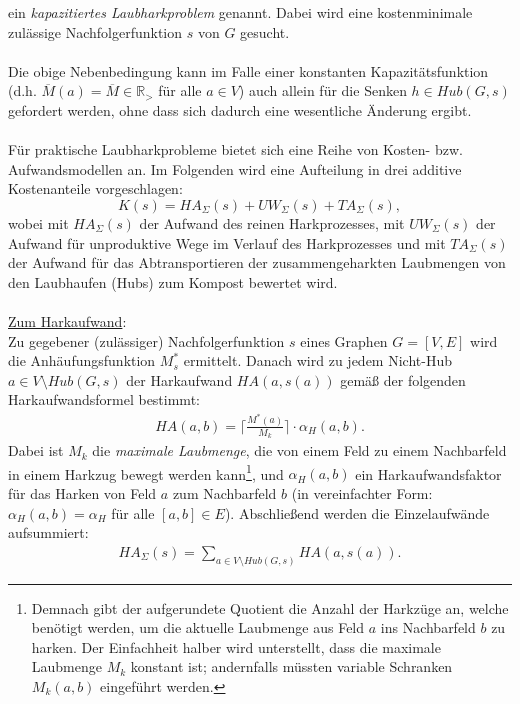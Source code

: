 \documentclass[fontsize=12pt,doubleside,openany,listof=totoc,listof=flat,listof=nochaptergap,numbers=noenddot]{article}
\begin{document}
\noindent ein \textit{kapazitiertes Laubharkproblem} genannt. Dabei wird eine kostenminimale zulässige Nachfolgerfunktion $s$ von $G$ gesucht.\\
\\
Die obige Nebenbedingung kann im Falle einer konstanten Kapazitätsfunktion (d.h. $\overline{M}(a)=\overline{M} \in \mathbb{R}_>$ für alle $a \in V$) auch allein für die Senken $h \in Hub(G,s)$ gefordert werden, ohne dass sich dadurch eine wesentliche Änderung ergibt. \\
\\
Für praktische Laubharkprobleme bietet sich eine Reihe von Kosten- bzw. Aufwandsmodellen an. Im Folgenden wird eine Aufteilung in drei additive Kostenanteile vorgeschlagen: 
\begin{equation*}
K(s) = HA_{\Sigma}(s) + UW_{\Sigma}(s) + TA_{\Sigma}(s),
\label{definition_Kostenfunktion}
\end{equation*} 
wobei mit $HA_{\Sigma}(s)$ der Aufwand des reinen Harkprozesses, mit $UW_{\Sigma}(s)$ der Aufwand für unproduktive Wege im Verlauf des Harkprozesses und mit $TA_{\Sigma}(s)$ der Aufwand für das Abtransportieren der zusammengeharkten Laubmengen von den Laubhaufen (Hubs) zum Kompost bewertet wird. \\
\\
\underline{Zum Harkaufwand}:\\
Zu gegebener (zulässiger) Nachfolgerfunktion $s$ eines Graphen $G=[V,E]$ wird die Anhäufungsfunktion $M^*_s$ ermittelt. Danach wird zu jedem Nicht-Hub $a \in V\setminus Hub(G,s)$ der Harkaufwand $HA(a,s(a))$ gemäß der folgenden  Harkaufwandsformel bestimmt: 
\begin{align*}
HA(a,b) = \Big\lceil \frac{M^*(a)}{M_k} \Big\rceil \cdot \alpha_H(a,b).
\end{align*}
Dabei ist $M_k$ die \textit{maximale Laubmenge}, die von einem Feld zu einem Nachbarfeld in einem Harkzug bewegt werden kann\footnote{Demnach gibt der aufgerundete Quotient die Anzahl der Harkzüge an, welche benötigt werden, um die aktuelle Laubmenge aus Feld $a$ ins Nachbarfeld $b$ zu harken. Der Einfachheit halber wird unterstellt, dass die maximale Laubmenge $M_k$ konstant ist; andernfalls müssten variable Schranken $M_k(a,b)$ eingeführt werden.}, und $\alpha_H(a,b)$ ein Harkaufwandsfaktor für das Harken von Feld $a$ zum Nachbarfeld $b$ (in vereinfachter Form: $\alpha_H(a,b) = \alpha_H$ für alle $[a,b] \in E$). 
Abschließend werden die Einzelaufwände aufsummiert: 
\begin{align*}
HA_{\Sigma}(s) = \sum_{a \in V\setminus Hub(G,s)}{HA(a,s(a))}. \label{Formel_Harkaufwandsumme}
\end{align*}
\end{document}
